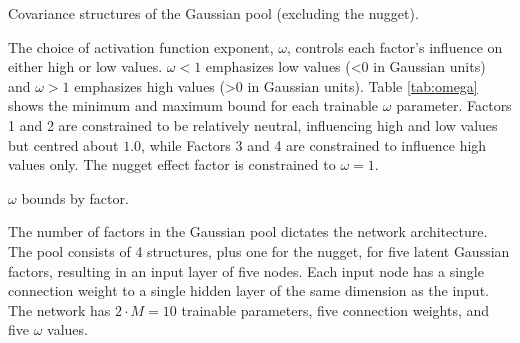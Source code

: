 
\begin{table}[!htb]
    \centering
    \caption{Covariance structures of the Gaussian pool (excluding the nugget).}
    \resizebox{0.9\width}{!}{}
    \label{tab:pool}
\end{table}

The choice of activation function exponent, $\omega$, controls each factor's influence on either high or low values. $\omega < 1$ emphasizes low values (<0 in Gaussian units) and $\omega > 1$ emphasizes high values (>0 in Gaussian units). Table \ref{tab:omega} shows the minimum and maximum bound for each trainable $\omega$ parameter. Factors 1 and 2 are constrained to be relatively neutral, influencing high and low values but centred about $1.0$, while Factors 3 and 4 are constrained to influence high values only. The nugget effect factor is constrained to $\omega=1$.

\begin{table}[!htb]
    \centering
    \caption{$\omega$ bounds by factor.}
    \resizebox{0.9\width}{!}{}
    \label{tab:omega}
\end{table}

The number of factors in the Gaussian pool dictates the network architecture. The pool consists of 4 structures, plus one for the nugget, for five latent Gaussian factors, resulting in an input layer of five nodes. Each input node has a single connection weight to a single hidden layer of the same dimension as the input. The network has $2 \cdot M = 10$ trainable parameters, five connection weights, and five $\omega$ values.

